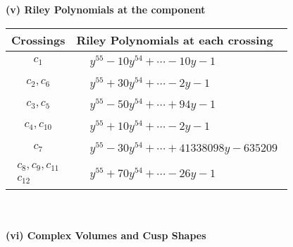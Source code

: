 \documentclass[1p]{elsarticle_modified}
\theoremstyle{definition}
\begin{document}
\newpage\renewcommand{\arraystretch}{1}
\flushleft \textbf{(v) Riley Polynomials at the component}\newline \\
\begin{tabular}{m{50pt}|m{274pt}}
Crossings & \hspace{64pt}Riley Polynomials at each crossing \\
\hline $$\begin{aligned}c_{1}\end{aligned}$$&$\begin{aligned}
&y^{55}-10 y^{54}+\cdots-10 y-1
\end{aligned}$\\
\hline $$\begin{aligned}c_{2},c_{6}\end{aligned}$$&$\begin{aligned}
&y^{55}+30 y^{54}+\cdots-2 y-1
\end{aligned}$\\
\hline $$\begin{aligned}c_{3},c_{5}\end{aligned}$$&$\begin{aligned}
&y^{55}-50 y^{54}+\cdots+94 y-1
\end{aligned}$\\
\hline $$\begin{aligned}c_{4},c_{10}\end{aligned}$$&$\begin{aligned}
&y^{55}+10 y^{54}+\cdots-2 y-1
\end{aligned}$\\
\hline $$\begin{aligned}c_{7}\end{aligned}$$&$\begin{aligned}
&y^{55}-30 y^{54}+\cdots+41338098 y-635209
\end{aligned}$\\
\hline $$\begin{aligned}c_{8},c_{9},c_{11}\\c_{12}\end{aligned}$$&$\begin{aligned}
&y^{55}+70 y^{54}+\cdots-26 y-1
\end{aligned}$\\
\hline
\end{tabular}\\~\\
\newpage\flushleft \textbf{(vi) Complex Volumes and Cusp Shapes}
\end{document}
